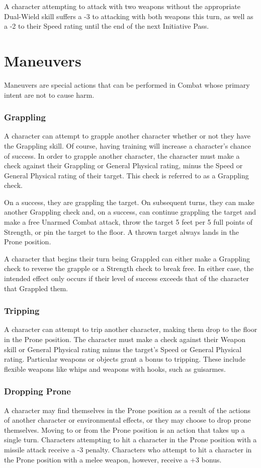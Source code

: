 \documentclass[oneside]{book}
\begin{document}
\begin{multicols}{2}
A character attempting to attack with two weapons without the appropriate Dual-Wield skill suffers a -3 to attacking with both weapons this turn, as well as a -2 to their Speed rating until the end of the next Initiative Pass. 

\section{Maneuvers}
Maneuvers are special actions that can be performed in Combat whose primary intent are not to cause harm. 

\subsubsection{Grappling}
A character can attempt to grapple another character whether or not they have the Grappling skill. Of course, having training will increase a character's chance of success. In order to grapple another character, the character must make a check against their Grappling or General Physical rating, minus the Speed or General Physical rating of their target. This check is referred to as a Grappling check. 

On a success, they are grappling the target. On subsequent turns, they can make another Grappling check and, on a success, can continue grappling the target and make a free Unarmed Combat attack, throw the target 5 feet per 5 full points of Strength, or pin the target to the floor. A thrown target always lands in the Prone position.

A character that begins their turn being Grappled can either make a Grappling check to reverse the grapple or a Strength check to break free. In either case, the intended effect only occurs if their level of success exceeds that of the character that Grappled them. 

\subsubsection{Tripping}
A character can attempt to trip another character, making them drop to the floor in the Prone position. The character must make a check against their Weapon skill or General Physical rating minus the target's Speed or General Physical rating. Particular weapons or objects grant a bonus to tripping. These include flexible weapons like whips and weapons with hooks, such as guisarmes.

\subsubsection{Dropping Prone}
A character may find themselves in the Prone position as a result of the actions of another character or environmental effects, or they may choose to drop prone themselves. Moving to or from the Prone position is an action that takes up a single turn. Characters attempting to hit a character in the Prone position with a missile attack receive a -3 penalty. Characters who attempt to hit a character in the Prone position with a melee weapon, however, receive a +3 bonus. 


\end{multicols}
\end{document}
